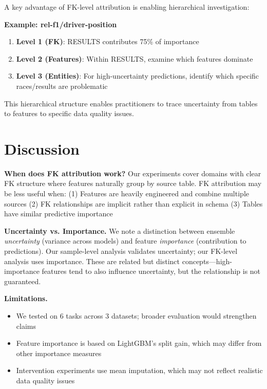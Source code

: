 \documentclass{article}
\begin{document}
A key advantage of FK-level attribution is enabling hierarchical investigation:

\textbf{Example: rel-f1/driver-position}
\begin{enumerate}
    \item \textbf{Level 1 (FK)}: RESULTS contributes 75\% of importance
    \item \textbf{Level 2 (Features)}: Within RESULTS, examine which features dominate
    \item \textbf{Level 3 (Entities)}: For high-uncertainty predictions, identify
    which specific races/results are problematic
\end{enumerate}

This hierarchical structure enables practitioners to trace uncertainty from tables
to features to specific data quality issues.

\section{Discussion}
\label{sec:discussion}

\textbf{When does FK attribution work?}
Our experiments cover domains with clear FK structure where features naturally group
by source table. FK attribution may be less useful when:
(1) Features are heavily engineered and combine multiple sources
(2) FK relationships are implicit rather than explicit in schema
(3) Tables have similar predictive importance

\textbf{Uncertainty vs. Importance.}
We note a distinction between ensemble \emph{uncertainty} (variance across models)
and feature \emph{importance} (contribution to predictions). Our sample-level
analysis validates uncertainty; our FK-level analysis uses importance. These are
related but distinct concepts---high-importance features tend to also influence
uncertainty, but the relationship is not guaranteed.

\textbf{Limitations.}
\begin{itemize}
    \item We tested on 6 tasks across 3 datasets; broader evaluation would strengthen claims
    \item Feature importance is based on LightGBM's split gain, which may differ from
    other importance measures
    \item Intervention experiments use mean imputation, which may not reflect realistic
    data quality issues
\end{itemize}
\end{document}
